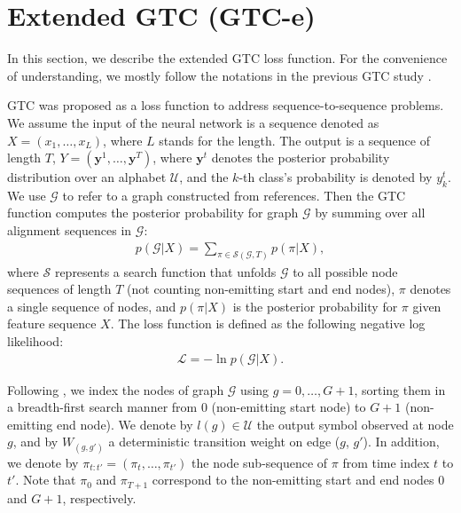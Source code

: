 \documentclass{article}
\begin{document}
\section{Extended GTC (GTC-e)}
\label{sec:gtc}

In this section, we describe the extended GTC loss function. For the convenience of understanding, we mostly follow the notations in the previous GTC study \cite{moritz2021semi}.

GTC was proposed as a loss function to address sequence-to-sequence problems. We assume the input of the neural network is a sequence denoted as $X=(x_1, \dots, x_{L})$, where $L$ stands for the length. The output is a sequence of length $T$, $Y=(\mathbf{y}^1, \dots, \mathbf{y}^T)$, where $\mathbf{y}^t$ denotes the posterior probability distribution over an alphabet $\mathcal{U}$, and the $k$-th class's probability is denoted by $y_k^t$. We use $\mathcal{G}$ to refer to a graph constructed from references. Then the GTC function computes the posterior probability for graph $\mathcal{G}$ by summing over all alignment sequences in $\mathcal{G}$:
\begin{align}
    p(\mathcal{G}|X) = \sum_{\pi \in \mathcal{S}(\mathcal{G},T)} p(\pi | X), \label{eq:gtc}
\end{align}
where $\mathcal{S}$ represents a search function that unfolds $\mathcal{G}$ to all possible node sequences of length $T$ (not counting non-emitting start and end nodes), $\pi$ denotes a single sequence of nodes, and $p(\pi|X)$ is the posterior probability for $\pi$ given feature sequence $X$. 
The loss function is defined as the following negative log likelihood:
\begin{align}
    \mathcal{L} = -\ln{p(\mathcal{G}|X)}. 
\label{eq:loss}
\end{align}

Following \cite{moritz2021semi}, we index the nodes of graph $\mathcal{G}$ using $g=0,\dots,G+1$, sorting them in a breadth-first search manner from $0$ (non-emitting start node) to $G+1$ (non-emitting end node). We denote by $l(g) \in \mathcal{U}$ the output symbol observed at node $g$, and by $W_{(g,g')}$ a deterministic transition weight on edge ($g$, $g'$). In addition, we denote by $\pi_{t:t'}=(\pi_t,\dots,\pi_{t'})$ the node sub-sequence of $\pi$ from time index $t$ to $t'$. Note that $\pi_0$ and $\pi_{T+1}$ correspond to the non-emitting start and end nodes $0$ and $G+1$, respectively.
\end{document}
